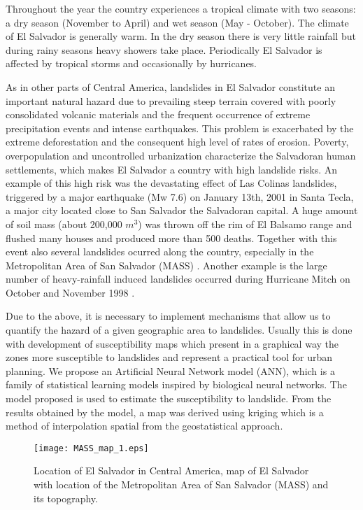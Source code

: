 \documentclass[11pt,twoside]{rmta2010eng}%
\begin{document}
Throughout the year the country experiences a tropical climate with two seasons: a dry season (November to April) and wet season (May - October). The climate of El Salvador is generally warm. In the dry season there is very little rainfall but during rainy seasons heavy showers take place. Periodically El Salvador is affected by tropical storms and occasionally by hurricanes.

As in other parts of Central America, landslides in El Salvador constitute an important natural hazard due to prevailing steep terrain covered with poorly consolidated volcanic materials and the frequent occurrence of extreme precipitation events and intense earthquakes. This problem is exacerbated by the extreme deforestation and the consequent high level of rates of erosion. Poverty, overpopulation and uncontrolled urbanization characterize the Salvadoran human settlements, which makes El Salvador a country with high landslide risks. An example of this high risk was the devastating effect of Las Colinas landslides,  triggered by a major earthquake (Mw 7.6) on January 13th, 2001 in Santa Tecla, a major city located close to San Salvador the Salvadoran capital\cite{evans}. A huge amount of soil mass (about 200,000 $m^{3}$) was thrown off the rim of El Balsamo range and flushed many houses and produced more than 500 deaths. Together with this event also several landslides ocurred along the country, especially in the Metropolitan Area of San Salvador (MASS) \cite{jibson}. Another example is the large number of heavy-rainfall induced landslides occurred during Hurricane Mitch on October and November 1998 \cite{crone}.   

Due to the above, it is necessary to implement mechanisms that allow us to quantify the hazard of a given geographic area to landslides. Usually this is done with development of susceptibility maps which present in a graphical way the zones more susceptible to landslides and represent a practical tool for urban planning. We propose an Artificial Neural Network model (ANN), which is a family of statistical learning models inspired by biological neural networks. The model proposed is used to estimate the susceptibility to landslide. From the results obtained by the model, a map was derived using kriging which is a method of interpolation spatial from the geostatistical approach. 


 \begin{center}
  \begin{figure}
   \centering
   \texttt{[image: MASS\_map\_1.eps]}
   \caption{\small{Location of El Salvador in Central America, map of El Salvador with location of the Metropolitan Area of San Salvador (MASS) and its topography.}}
   \label{fig:mass01}
  \end{figure}
 \end{center}
\end{document}
